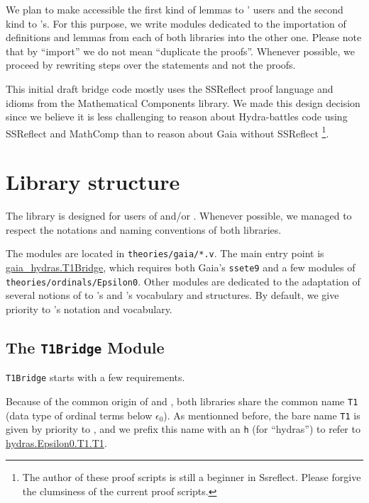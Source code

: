   We plan to make accessible the first kind of lemmas to \HydrasLib' users and the second kind to \gaia's. For this purpose, we write modules dedicated to the importation of definitions and lemmas from each of both libraries into the other one.
Please note that by ``import'' we do not mean ``duplicate the proofs''.  Whenever possible, we proceed by rewriting steps over the statements and not the proofs. 



This initial draft bridge code mostly uses the SSReflect proof language
and idioms from the Mathematical Components library. We made this design
decision since we believe it is less challenging to reason about
Hydra-battles code using SSReflect and MathComp than to reason about
Gaia without SSReflect \footnote{The author of these proof scripts is still a beginner in Ssreflect. Please forgive the clumsiness of the current proof scripts.}.

\section{Library structure}
The \gaiaHydras library is designed for users of
\gaia and/or  \HydrasLib. Whenever possible, we managed to respect the notations and naming conventions of both libraries.

The modules are located in {\texttt{theories/gaia/*.v}}.
The main entry point is
\href{../theories/html/gaia_hydras.T1Bridge.html}{gaia\_hydras.T1Bridge}, which requires both Gaia's \texttt{ssete9} and a few modules of \texttt{theories/ordinals/Epsilon0}.
Other modules are dedicated to the adaptation of several notions of \HydrasLib to \mathcomp's and \gaia's vocabulary and structures.
By default, we give priority to \gaia's notation and vocabulary.


\subsection{The \texttt{T1Bridge} Module}

\texttt{T1Bridge} starts with a few requirements.

Because of the common origin of \HydrasLib and \gaia, both libraries share the common name \texttt{T1} (data type of ordinal terms below $\epsilon_0$). As mentionned before, the bare name \texttt{T1} is given by priority to \gaia, and we prefix this name with an \texttt{h} (for ``hydras'') to refer to
\href{../theories/html/Epsilon0.T1.html}{hydras.Epsilon0.T1.T1}.

